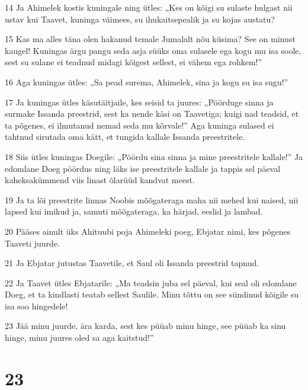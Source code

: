 \par 14 Ja Ahimelek kostis kuningale ning ütles: „Kes on kõigi su sulaste hulgast nii ustav kui Taavet, kuninga väimees, su ihukaitsepealik ja su kojas austatu?
\par 15 Kas ma alles täna olen hakanud temale Jumalalt nõu küsima? See on minust kaugel! Kuningas ärgu pangu seda asja süüks oma sulasele ega kogu mu isa soole, sest su sulane ei teadnud midagi kõigest sellest, ei vähem ega rohkem!”
\par 16 Aga kuningas ütles: „Sa pead surema, Ahimelek, sina ja kogu su isa sugu!”
\par 17 Ja kuningas ütles käsutäitjaile, kes seisid ta juures: „Pöörduge sinna ja surmake Issanda preestrid, sest ka nende käsi on Taavetiga; kuigi nad teadsid, et ta põgenes, ei ilmutanud nemad seda mu kõrvale!” Aga kuninga sulased ei tahtnud sirutada oma kätt, et tungida kallale Issanda preestritele.
\par 18 Siis ütles kuningas Doegile: „Pöördu sina sinna ja mine preestritele kallale!” Ja edomlane Doeg pöördus ning läks ise preestritele kallale ja tappis sel päeval kaheksakümmend viis linast õlarüüd kandvat meest.
\par 19 Ja ta lõi preestrite linnas Noobis mõõgateraga maha nii mehed kui naised, nii lapsed kui imikud ja, samuti mõõgateraga, ka härjad, eeslid ja lambad.
\par 20 Pääses ainult üks Ahituubi poja Ahimeleki poeg, Ebjatar nimi, kes põgenes Taaveti juurde.
\par 21 Ja Ebjatar jutustas Taavetile, et Saul oli Issanda preestrid tapnud.
\par 22 Ja Taavet ütles Ebjatarile: „Ma teadsin juba sel päeval, kui seal oli edomlane Doeg, et ta kindlasti teatab sellest Saulile. Minu tõttu on see sündinud kõigile su isa soo hingedele!
\par 23 Jää minu juurde, ära karda, sest kes püüab minu hinge, see püüab ka sinu hinge, minu juures oled sa aga kaitstud!”

\chapter{23}

